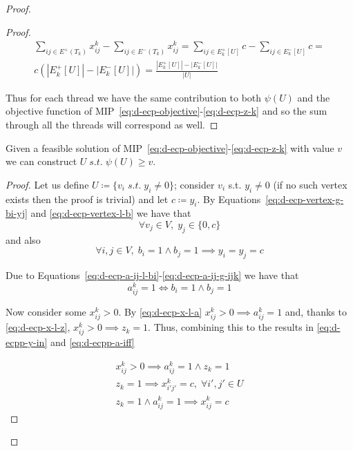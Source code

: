 \begin{proof}
\begin{proof}
		\begin{multline*}
			\sum^{}_{ij \in E^{+} (T_{k})} x_{ij} ^{k} - \sum_{ij \in E^{-}
				(T_{k})} x_{ij} ^{k} = \sum^{}_{ij \in E^{+}_k[U] } c - \sum_{ij \in E^{-}
			_k[U]} c = \\ c (|E^{+}_{k}[U]| - |E^{-}_{k}[U]|) =
			\frac{|E^{+}_{k}[U]| - |E^{-}_{k}[U]|}{|U|}
		\end{multline*}

		Thus for each thread we have the same contribution to both $\psi(U)$
		and the objective function of
		MIP~\ref{eq:d-ecp-objective}-\ref{eq:d-ecp-z-k} and so the sum through
		all the threads will correspond as well.
	\end{proof}

	\begin{claim}
		Given a feasible solution of
		MIP~\ref{eq:d-ecp-objective}-\ref{eq:d-ecp-z-k} with value $v$ we can
		construct $U \; s.t. \; \psi(U) \geq v$.
	\end{claim}

	\begin{proof}

		Let us define $U \coloneqq \{ v_i \; s.t. \; y_i \neq 0\}$; consider
		$v_i$ s.t. $y_i \neq 0$ (if no such vertex exists then the proof is
		trivial) and let $c \coloneqq y_i$. By
		Equations~\ref{eq:d-ecp-vertex-g-bi-yj} and \ref{eq:d-ecp-vertex-l-b}
		we have that
		\begin{equation}
			\label{eq:d-ecpp-y-in}
			\forall v_j \in V, \; y_j \in \{ 0, c\}
		\end{equation}
		and also
		\begin{equation}
			\forall i, j \in V, \; b_i = 1 \land b_j = 1 \implies y_i = y_j = c
		\end{equation}

		Due to Equations~\ref{eq:d-ecp-a-ij-l-bi}-\ref{eq:d-ecp-a-ij-g-ijk} we
		have that
		\begin{equation}
			\label{eq:d-ecpp-a-iff}
			a_{ij}^{k} = 1 \iff b_i = 1 \land b_j = 1
		\end{equation}

		Now consider some $x_{ij}^{k} > 0 $. By \autoref{eq:d-ecp-x-l-a}
		$x_{ij}^{k} > 0 \implies a _{ij}^{k} = 1$ and, thanks to
		\autoref{eq:d-ecp-x-l-z}, $x_{ij}^{k} > 0 \implies z_k = 1$. Thus, combining
		this to the results in \autoref{eq:d-ecpp-y-in} and
		\autoref{eq:d-ecpp-a-iff}

		\begin{gather}
			\label{eq:d-ecpp-x-impl}
			x_{ij}^{k} > 0 \implies a_{ij}^{k} = 1 \land z_k =1 \\
			\label{eq:d-ecpp-z-impl}
			z_k = 1 \implies x_{i'j'}^{k} = c, \; \forall i', j' \in U \\
			\label{eq:d-ecpp-za-impl}
			z_k = 1 \land a_{ij}^{k} = 1 \implies x_{ij}^{k} = c
		\end{gather}


\end{proof}
\end{proof}
